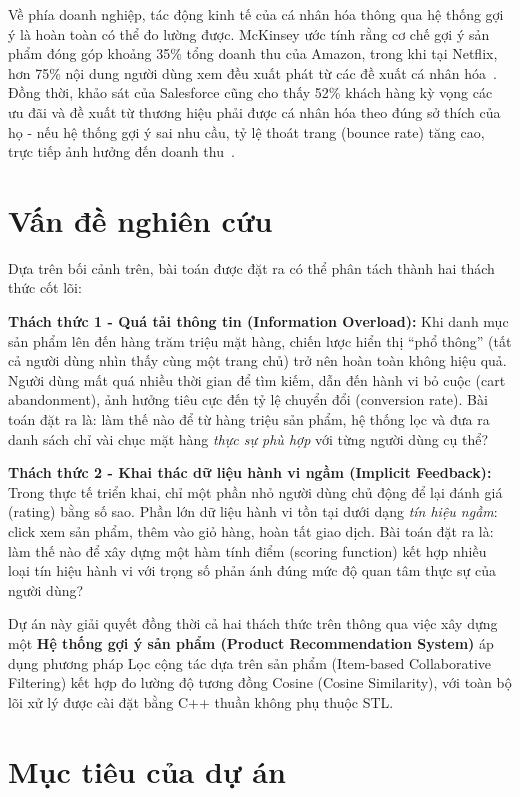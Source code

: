 \documentclass{report}
\begin{document}
Về phía doanh nghiệp, tác động kinh tế của cá nhân hóa thông qua hệ thống gợi ý là hoàn toàn có thể đo lường được. McKinsey ước tính rằng cơ chế gợi ý sản phẩm đóng góp khoảng 35\% tổng doanh thu của Amazon, trong khi tại Netflix, hơn 75\% nội dung người dùng xem đều xuất phát từ các đề xuất cá nhân hóa~\cite{mckinsey2025}. Đồng thời, khảo sát của Salesforce cũng cho thấy 52\% khách hàng kỳ vọng các ưu đãi và đề xuất từ thương hiệu phải được cá nhân hóa theo đúng sở thích của họ - nếu hệ thống gợi ý sai nhu cầu, tỷ lệ thoát trang (bounce rate) tăng cao, trực tiếp ảnh hưởng đến doanh thu~\cite{salesforce2023}.

\section{Vấn đề nghiên cứu}

Dựa trên bối cảnh trên, bài toán được đặt ra có thể phân tách thành hai thách thức cốt lõi:

\textbf{Thách thức 1 - Quá tải thông tin (Information Overload):} Khi danh mục sản phẩm lên đến hàng trăm triệu mặt hàng, chiến lược hiển thị ``phổ thông'' (tất cả người dùng nhìn thấy cùng một trang chủ) trở nên hoàn toàn không hiệu quả. Người dùng mất quá nhiều thời gian để tìm kiếm, dẫn đến hành vi bỏ cuộc (cart abandonment), ảnh hưởng tiêu cực đến tỷ lệ chuyển đổi (conversion rate). Bài toán đặt ra là: làm thế nào để từ hàng triệu sản phẩm, hệ thống lọc và đưa ra danh sách chỉ vài chục mặt hàng \textit{thực sự phù hợp} với từng người dùng cụ thể?

\textbf{Thách thức 2 - Khai thác dữ liệu hành vi ngầm (Implicit Feedback):} Trong thực tế triển khai, chỉ một phần nhỏ người dùng chủ động để lại đánh giá (rating) bằng số sao. Phần lớn dữ liệu hành vi tồn tại dưới dạng \textit{tín hiệu ngầm}: click xem sản phẩm, thêm vào giỏ hàng, hoàn tất giao dịch. Bài toán đặt ra là: làm thế nào để xây dựng một hàm tính điểm (scoring function) kết hợp nhiều loại tín hiệu hành vi với trọng số phản ánh đúng mức độ quan tâm thực sự của người dùng?

Dự án này giải quyết đồng thời cả hai thách thức trên thông qua việc xây dựng một \textbf{Hệ thống gợi ý sản phẩm (Product Recommendation System)} áp dụng phương pháp Lọc cộng tác dựa trên sản phẩm (Item-based Collaborative Filtering) kết hợp đo lường độ tương đồng Cosine (Cosine Similarity), với toàn bộ lõi xử lý được cài đặt bằng C++ thuần không phụ thuộc STL.

\section{Mục tiêu của dự án}
\end{document}
